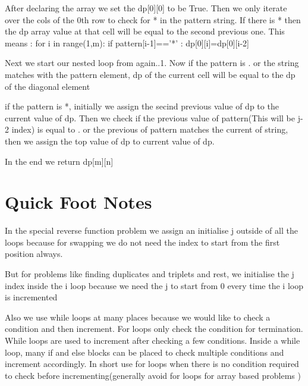 \documentclass{article}
\newcommand{\nd}{\noindent}
\begin{document}
\nd After declaring the array we set the dp[0][0] to be True. Then we only iterate over the cols of the 0th row to check for * in the pattern string. If there is * then the dp array value at that cell will be equal to the second previous one. This means : for i in range(1,m): if pattern[i-1]=='*' : dp[0][i]=dp[0][i-2]  

\nd Next we start our nested loop from again..1. Now if the pattern is . or the string matches with the pattern element, dp of the current cell will be equal to the dp of the diagonal element 

\nd if the pattern is *, initially we assign the secind previous value of dp to the current value of dp. Then we check if the previous value of pattern(This will be j-2 index) is equal to . or the previous of pattern matches the current of string, then we assign the top value of dp to current value of dp. 

\nd In the end we return dp[m][n]


\section{Quick Foot Notes}
In the special reverse function problem we assign an initialise j outside of all the loops because for swapping we do not need the index to start from the first position always. 

\nd But for problems like finding duplicates and triplets and rest, we initialise the j index inside the i loop because we need the j to start from 0 every time the i loop is incremented

\nd Also we use while loops at many places because we would like to check a condition and then increment. For loops only check the condition for termination. While loops are used to increment after checking a few conditions. Inside a while loop, many if and else blocks can be placed to check multiple conditions and increment accordingly. In short use for loops when there is no condition required to check before incrementing(generally avoid for loops for array based problems )
\end{document}
